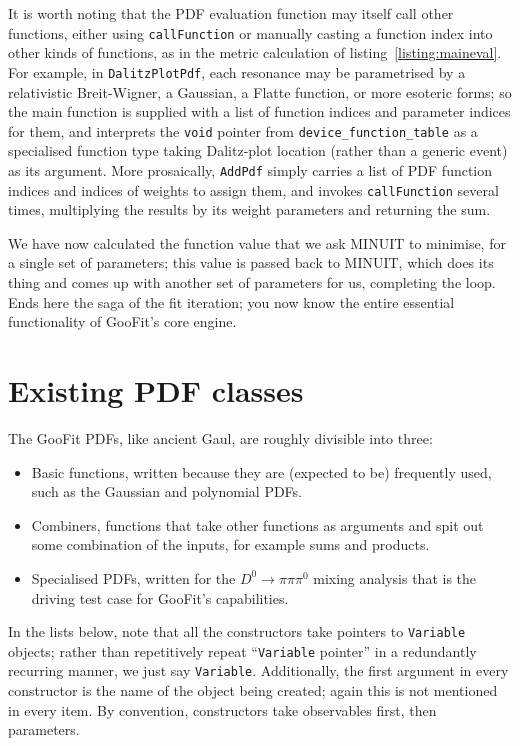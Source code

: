 \documentclass[12pt,pdflatex]{article}
\begin{document}
It is worth noting that the PDF evaluation function may itself call other functions,
either using \verb|callFunction| or manually casting a function index into other
kinds of functions, as in the metric calculation of listing~\ref{listing:maineval}.
For example, in \verb|DalitzPlotPdf|, each resonance may be parametrised
by a relativistic Breit-Wigner, a Gaussian, a Flatte function, or more esoteric forms;
so the main function is supplied with a list of function indices and parameter indices
for them, and interprets the \verb|void| pointer from \verb|device_function_table| as a specialised
function type taking Dalitz-plot location (rather than a generic event) as its argument. 
More prosaically, \verb|AddPdf| simply carries a list of PDF function indices
and indices of weights to assign them, and invokes \verb|callFunction| several times,
multiplying the results by its weight parameters and returning the sum. 

We have now calculated the function value that we ask MINUIT to minimise, for 
a single set of parameters; this value is passed back to MINUIT, which does its
thing and comes up with another set of parameters for us, completing the loop. 
Ends here the saga of the fit iteration; you now know the entire essential
functionality of GooFit's core engine. 

\section{Existing PDF classes}

The GooFit PDFs, like ancient Gaul, are roughly divisible into three:
\begin{itemize}
\item Basic functions, written because they are (expected to be) frequently used,
such as the Gaussian and polynomial PDFs.
\item Combiners, functions that take other functions as arguments and
spit out some combination of the inputs, for example sums and products.
\item Specialised PDFs, written for the $D^0\to\pi\pi\pi^0$ mixing analysis
that is the driving test case for GooFit's capabilities. 
\end{itemize}

In the lists below, note that all the constructors
take pointers to \texttt{Variable} objects; rather than 
repetitively repeat ``\texttt{Variable} pointer''
in a redundantly recurring manner, we just say \texttt{Variable}. 
Additionally, the first argument in every constructor is the name
of the object being created; again this is not mentioned in every
item. By convention, constructors take observables first, then parameters. 
\end{document}
